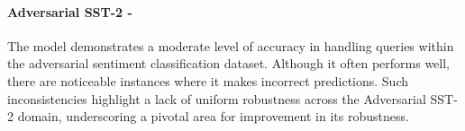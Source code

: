 \paragraph{Adversarial SST-2 - \moderate}
The model demonstrates a moderate level of accuracy in handling queries within the adversarial sentiment classification dataset. Although it often performs well, there are noticeable instances where it makes incorrect predictions. Such inconsistencies highlight a lack of uniform robustness across the Adversarial SST-2 domain, underscoring a pivotal area for improvement in its robustness. 
